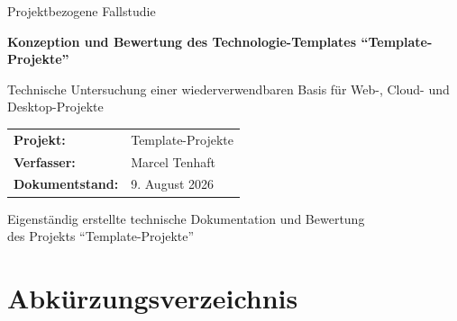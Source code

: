 \documentclass[11pt,a4paper]{article}
\newcommand{\arbeitstitel}{Konzeption und Bewertung des
  Technologie-Templates \enquote{Template-Projekte}}
\newcommand{\arbeituntertitel}{Technische Untersuchung einer
  wiederverwendbaren Basis für Web-, Cloud- und Desktop-Projekte}
\newcommand{\arbeitart}{Projektbezogene Fallstudie}
\newcommand{\projektname}{Template-Projekte}
\newcommand{\autorname}{Marcel Tenhaft}
\newcommand{\dokumentstand}{9. August 2026}
\begin{document}
\hypersetup{pageanchor=false}
\thispagestyle{empty}

\begin{titlepage}
  \centering

  {\Large \arbeitart \par}
  \vspace{1.8cm}

  {\bfseries\LARGE \arbeitstitel \par}
  \vspace{0.6cm}

  {\large \arbeituntertitel \par}
  \vspace{2.5cm}

  \begin{tabularx}{0.82\textwidth}{@{}lX@{}}
    \textbf{Projekt:}        & \projektname \\
    \textbf{Verfasser:}      & \autorname \\
    \textbf{Dokumentstand:}  & \dokumentstand \\
  \end{tabularx}

  \vfill

  {\small
  Eigenständig erstellte technische Dokumentation und Bewertung\\
  des Projekts \enquote{\projektname}
  \par}
\end{titlepage}

\hypersetup{pageanchor=true}
\setcounter{page}{1}

\clearpage
\tableofcontents

\clearpage
\renewcommand{\listfigurename}{Abbildungsverzeichnis}
{}
\listoffigures

\clearpage
\renewcommand{\listtablename}{Tabellenverzeichnis}
{}
\listoftables

\clearpage
{}
\section*{Abkürzungsverzeichnis}
\end{document}
